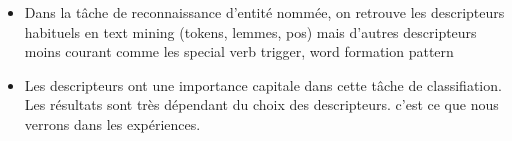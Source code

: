 \begin{itemize}

\item Dans la tâche de reconnaissance d'entité nommée, on retrouve les descripteurs habituels en text mining (tokens, lemmes, pos) mais d'autres descripteurs moins courant comme les special verb trigger, word formation pattern

\item Les descripteurs ont une importance capitale dans cette tâche de classifiation. Les résultats sont très dépendant du choix des descripteurs. c'est ce que nous verrons dans les expériences.
\end{itemize}


